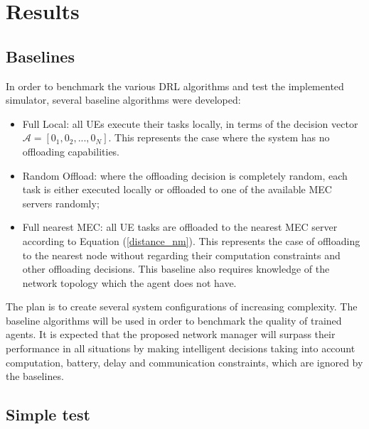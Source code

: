 \chapter{Results}

\section{Baselines} \label{baselines}
\noindent In order to benchmark the various \acrshort{DRL} algorithms and test the implemented simulator, several baseline algorithms were developed:

\begin{itemize}
    \item Full Local: all \acrshort{UE}s execute their tasks locally, in terms of the decision vector $\mathcal{A}=[0_1, 0_2, ..., 0_N]$. This represents the case where the system has no offloading capabilities.
    \item Random Offload: where the offloading decision is completely random, each task is either executed locally or offloaded to one of the available \acrshort{MEC} servers randomly;
    \item Full nearest \acrshort{MEC}: all \acrshort{UE} tasks are offloaded to the nearest \acrshort{MEC} server according to Equation (\ref{distance_nm}). This represents the case of offloading to the nearest node without regarding their computation constraints and other offloading decisions. This baseline also requires knowledge of the network topology which the agent does not have.
\end{itemize}

The plan is to create several system configurations of increasing complexity. The baseline algorithms will be used in order to benchmark the quality of trained agents. It is expected that the proposed network manager will surpass their performance in all situations by making intelligent decisions taking into account computation, battery, delay and communication constraints, which are ignored by the baselines.

\section{Simple test} \label{simple_test}

